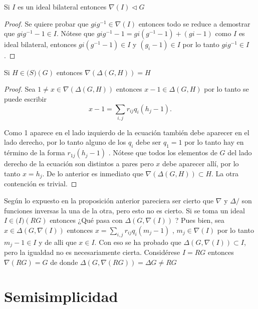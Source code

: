 \begin{lema}
Si $I$ es un ideal bilateral entonces $\nabla(I) \lhd G$
\end{lema}

\begin{proof}
Se quiere probar que $gig^{-1} \in \nabla(I)$ entonces todo se reduce a demostrar que $gig^{-1} -1 \in I$. Nótese que $gig^{-1}-1 = gi(g^{-1}-1)+(gi-1) $ como $I$ es ideal bilateral, entonces $gi(g^{-1}-1) \in I$ y $(g_i-1) \in I$  por lo tanto $gig^{-1} \in I$. \qedhere
\end{proof}


\begin{proposicion}
Si $H \in \mathcal(S)(G)$ entonces $\nabla(\Delta(G,H)) = H$ 
\end{proposicion}

\begin{proof}

Sea $1 \neq x \in \nabla(\Delta(G,H))$ entonces $x-1 \in \Delta(G,H)$ por lo tanto se puede escribir 
$$x-1 = \sum_{i,j}r_{ij}q_i(h_j-1).$$

Como 1 aparece en el lado izquierdo de la ecuación también debe aparecer en el lado derecho, por lo tanto alguno de los $q_i$ debe ser $q_1=1$ por lo tanto hay en término de la forma $r_{1j}(h_j-1)$ . Nótese que todos los elementos de $G$ del lado derecho de la ecuación son distintos a pares pero $x$ debe aparecer allí, por lo tanto $x = h_j$. De lo anterior es inmediato que $\nabla(\Delta(G,H)) \subset H$. La otra contención es trivial. \qedhere
\end{proof}

Según lo expuesto en la proposición anterior pareciera ser cierto que $\nabla$ y $\Delta/$ son funciones inversas la una de la otra, pero esto no es cierto. 
Si se toma un ideal $I \in \mathcal(I)(RG)$ entonces ¿Qué pasa con $\Delta(G,\nabla(I))$ ? Pues bien, sea $x \in \Delta(G, \nabla (I))$ entonces $x = \sum_{i,j} r_{ij}q_i(m_j-1)$ , $m_j \in \nabla(I)$ por lo tanto $m_j -1\in I$ y de alli que $x \in I$. Con eso se ha probado que $\Delta(G,\nabla(I)) \subset I$, pero la igualdad no es necesariamente cierta. Considérese $I=RG$ entonces $\nabla(RG) = G$ de donde $\Delta (G,\nabla(RG)) = \Delta G \neq RG $



\section{Semisimplicidad}

